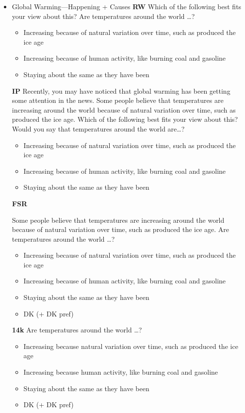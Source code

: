 \begin{itemize}
\item Global Warming—Happening + Causes\newline
\textbf{RW}\newline
Which of the following best fits your view about this? Are temperatures around the
world \ldots?
\begin{itemize}
	\item Increasing because of natural variation over time, such as produced the ice age
	\item Increasing because of human activity, like burning coal and gasoline
	\item Staying about the same as they have been
\end{itemize}

\textbf{IP}\newline
Recently, you may have noticed that global warming has been getting some attention
in the news. Some people believe that temperatures are increasing around the world
because of natural variation over time, such as produced the ice age. Which of the
following best fits your view about this? Would you say that temperatures around the
world are\ldots?
\begin{itemize}
	\item Increasing because of natural variation over time, such as produced the ice age
	\item Increasing because of human activity, like burning coal and gasoline
	\item Staying about the same as they have been
\end{itemize}

\textbf{FSR}\newline

Some people believe that temperatures are increasing around the world because of
natural variation over time, such as produced the ice age. Are temperatures around
the world \ldots?
\begin{itemize}
	\item Increasing because of natural variation over time, such as produced the ice age
	\item Increasing because of human activity, like burning coal and gasoline
	\item Staying about the same as they have been
	\item DK (+ DK pref)
\end{itemize}

\textbf{14k}\newline
Are temperatures around the world \ldots?
\begin{itemize}
	\item Increasing because natural variation over time, such as produced the ice age
	\item Increasing because human activity, like burning coal and gasoline
	\item Staying about the same as they have been
	\item DK (+ DK pref)
\end{itemize}


\end{itemize}
